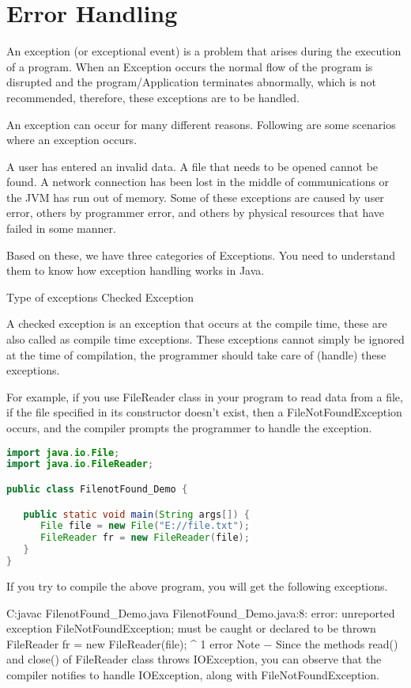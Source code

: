 \chapter{Error Handling}

An exception (or exceptional event) is a problem that arises during the execution of a program. When an Exception occurs the normal flow of the program is disrupted and the program/Application terminates abnormally, which is not recommended, therefore, these exceptions are to be handled.

An exception can occur for many different reasons. Following are some scenarios where an exception occurs.

A user has entered an invalid data.
A file that needs to be opened cannot be found.
A network connection has been lost in the middle of communications or the JVM has run out of memory.
Some of these exceptions are caused by user error, others by programmer error, and others by physical resources that have failed in some manner.

Based on these, we have three categories of Exceptions. You need to understand them to know how exception handling works in Java.

Type of exceptions
Checked Exception

A checked exception is an exception that occurs at the compile time, these are also called as compile time exceptions. These exceptions cannot simply be ignored at the time of compilation, the programmer should take care of (handle) these exceptions.

For example, if you use FileReader class in your program to read data from a file, if the file specified in its constructor doesn't exist, then a FileNotFoundException occurs, and the compiler prompts the programmer to handle the exception.

\begin{lstlisting}[language=Java]
import java.io.File;
import java.io.FileReader;

public class FilenotFound_Demo {

   public static void main(String args[]) {
      File file = new File("E://file.txt");
      FileReader fr = new FileReader(file);
   }
}
\end{lstlisting}

If you try to compile the above program, you will get the following exceptions.

C:\>javac FilenotFound_Demo.java
FilenotFound_Demo.java:8: error: unreported exception FileNotFoundException; must be caught or declared to be thrown
      FileReader fr = new FileReader(file);
                      ^
1 error
Note − Since the methods read() and close() of FileReader class throws IOException, you can observe that the compiler notifies to handle IOException, along with FileNotFoundException.

